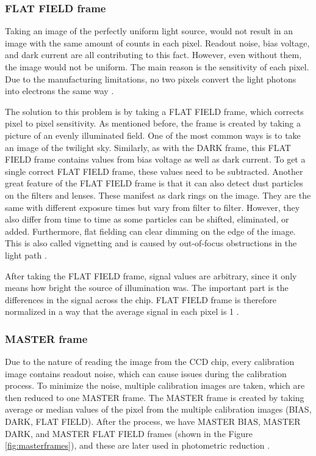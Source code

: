     \subsubsection{FLAT FIELD frame} 
    
    Taking an image of the perfectly uniform light source, would not result in an image with the same amount of counts in each pixel. Readout noise, bias voltage, and dark current are all contributing to this fact. However, even without them, the image would not be uniform. The main reason is the sensitivity of each pixel. Due to the manufacturing limitations, no two pixels convert the light photons into electrons the same way \cite{articleCCDartifacts} \cite{phy217}.
    
    The solution to this problem is by taking a FLAT FIELD frame, which corrects pixel to pixel sensitivity. As mentioned before, the frame is created by taking a picture of an evenly illuminated field. One of the most common ways is to take an image of the twilight sky.
    Similarly, as with the DARK frame, this FLAT FIELD frame contains values from bias voltage as well as dark current. To get a single correct FLAT FIELD frame, these values need to be subtracted.
    Another great feature of the FLAT FIELD frame is that it can also detect dust particles on the filters and lenses. These manifest as dark rings on the image. They are the same with different exposure times but vary from filter to filter. However, they also differ from time to time as some particles can be shifted, eliminated, or added. 
    Furthermore, flat fielding can clear dimming on the edge of the image. This is also called vignetting and is caused by out-of-focus obstructions in the light path \cite{articleParimucha} \cite{phy217}.
    
    After taking the FLAT FIELD frame, signal values are arbitrary, since it only means how bright the source of illumination was. The important part is the differences in the signal across the chip. FLAT FIELD frame is therefore normalized in a way that the average signal in each pixel is 1 \cite{phy217}.
    
        
    \subsubsection{MASTER frame}
    
    Due to the nature of reading the image from the CCD chip, every calibration image contains readout noise, which can cause issues during the calibration process. To minimize the noise, multiple calibration images are taken, which are then reduced to one MASTER frame. 
    The MASTER frame is created by taking average or median values of the pixel from the multiple calibration images (BIAS, DARK, FLAT FIELD).
    After the process, we have MASTER BIAS, MASTER DARK, and MASTER FLAT FIELD frames (shown in the Figure \ref{fig:masterframes}), and these are later used in photometric reduction \cite{articleParimucha}.
   
